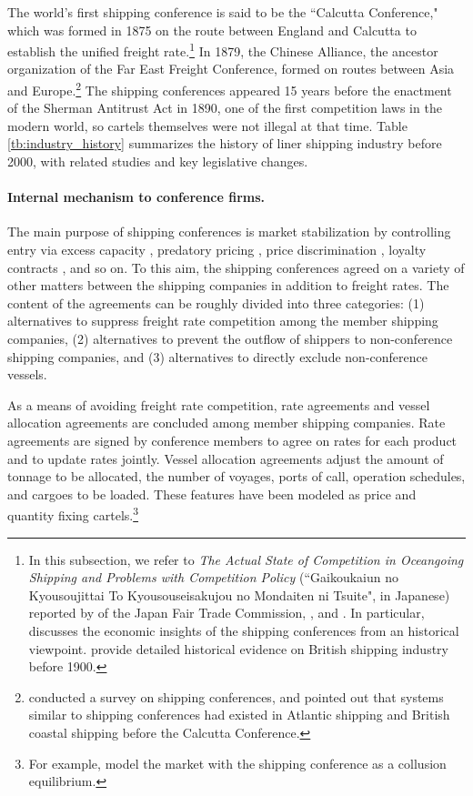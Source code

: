 \documentclass[11pt]{article}
\begin{document}
The world's first shipping conference is said to be the ``Calcutta Conference," which was formed in 1875 on the route between England and Calcutta to establish the unified freight rate.\footnote{In this subsection, we refer to \textit{The Actual State of Competition in Oceangoing Shipping and Problems with Competition Policy} (``Gaikoukaiun no Kyousoujittai To Kyousouseisakujou no Mondaiten ni Tsuite", in Japanese) reported by \cite{gaikoukaiun_no_kyousoujittai2006} of the Japan Fair Trade Commission,  \cite{branch2013maritime}, and \cite{sjostrom2013competition}. In particular, \cite{sjostrom1989collusion} discusses the economic insights of the shipping conferences from an historical viewpoint. \cite{morton1997entry} provide detailed historical evidence on British shipping industry before 1900.} In 1879, the Chinese Alliance, the ancestor organization of the Far East Freight Conference, formed on routes between Asia and Europe.\footnote{\cite{sjostrom2004ocean} conducted a survey on shipping conferences, and pointed out that systems similar to shipping conferences had existed in Atlantic shipping and British coastal shipping before the Calcutta Conference.} The shipping conferences appeared 15 years before the enactment of the Sherman Antitrust Act in 1890, one of the first competition laws in the modern world, so cartels themselves were not illegal at that time. Table \ref{tb:industry_history} summarizes the history of liner shipping industry before 2000, with related studies and key legislative changes.

\paragraph{Internal mechanism to conference firms.}
The main purpose of shipping conferences is market stabilization by controlling entry via excess capacity \citep{fusillo2003excess}, predatory pricing \citep{morton1997entry,podolny1999social}, price discrimination \citep{fox1992empirical,clyde1998market}, loyalty contracts \citep{marin2003exclusive}, and so on. To this aim, the shipping conferences agreed on a variety of other matters between the shipping companies in addition to freight rates. The content of the agreements can be roughly divided into three categories: (1) alternatives to suppress freight rate competition among the member shipping companies, (2) alternatives to prevent the outflow of shippers to non-conference shipping companies, and (3) alternatives to directly exclude non-conference vessels.

As a means of avoiding freight rate competition, rate agreements and vessel allocation agreements are concluded among member shipping companies. Rate agreements are signed by conference members to agree on rates for each product and to update rates jointly. Vessel allocation agreements adjust the amount of tonnage to be allocated, the number of voyages, ports of call, operation schedules, and cargoes to be loaded. These features have been modeled as price and quantity fixing cartels.\footnote{For example, \cite{clyde1998market} model the market with the shipping conference as a collusion equilibrium.}
\end{document}
